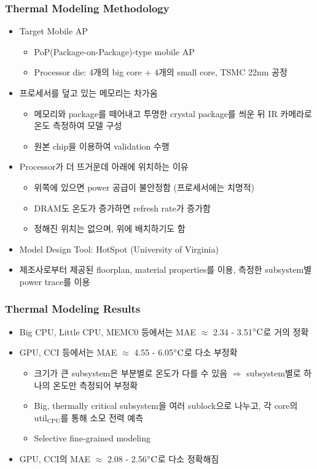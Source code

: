 \subsubsection*{Thermal Modeling Methodology}
\begin{itemize}
    \item Target Mobile AP
    \begin{itemize}
        \item PoP(Package-on-Package)-type mobile AP
        \item Processor die: 4개의 big core + 4개의 small core, TSMC 22nm 공정
    \end{itemize}
    \item 프로세서를 덮고 있는 메모리는 차가움
    \begin{itemize}
        \item 메모리와 package를 떼어내고 투명한 crystal package를 씌운 뒤 IR 카메라로 온도 측정하여 모델 구성
        \item 원본 chip을 이용하여 validation 수행
    \end{itemize}
    \item Processor가 더 뜨거운데 아래에 위치하는 이유
    \begin{itemize}
        \item 위쪽에 있으면 power 공급이 불안정함 (프로세서에는 치명적)
        \item DRAM도 온도가 증가하면 refresh rate가 증가함
        \item 정해진 위치는 없으며, 위에 배치하기도 함
    \end{itemize}
    \item Model Design Tool: HotSpot (University of Virginia)
    \item 제조사로부터 제공된 floorplan, material properties를 이용, 측정한 subsystem별 power trace를 이용
\end{itemize}
\begin{figures}
\end{figures}

\subsubsection*{Thermal Modeling Results}
\begin{itemize}
    \item Big CPU, Little CPU, MEMC0 등에서는 MAE $\approx$ 2.34 - 3.51$^{\circ}\mathrm{C}$로 거의 정확
    \item GPU, CCI 등에서는 MAE $\approx$ 4.55 - 6.05$^{\circ}\mathrm{C}$로 다소 부정확
    \begin{itemize}
        \item 크기가 큰 subsystem은 부분별로 온도가 다를 수 있음 $\Rightarrow$ subsystem별로 하나의 온도만 측정되어 부정확
        \item Big, thermally critical subsystem을 여러 sublock으로 나누고, 각 core의 $\mathrm{util_{CPU}}$를 통해 소모 전력 예측
        \item Selective fine-grained modeling
    \end{itemize}
    \item GPU, CCI의 MAE $\approx$ 2.08 - 2.56$^{\circ}\mathrm{C}$로 다소 정확해짐
\end{itemize}

